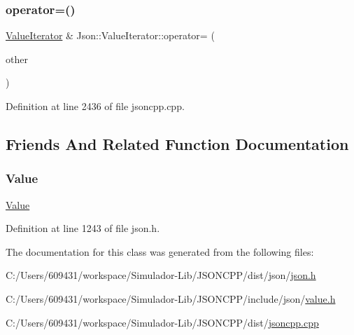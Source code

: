 \hypertarget{class_json_1_1_value_iterator_a8e23312b1db874f7e403fd7e76611bdc}{}\label{class_json_1_1_value_iterator_a8e23312b1db874f7e403fd7e76611bdc} 
\subsubsection{\texorpdfstring{operator=()}{operator=()}\hspace{0.1cm}{\footnotesize\ttfamily [2/2]}}
{\footnotesize\ttfamily \hyperlink{class_json_1_1_value_iterator}{Value\+Iterator} \& Json\+::\+Value\+Iterator\+::operator= (\begin{DoxyParamCaption}\item[{const \hyperlink{class_json_1_1_value_iterator_base_a9d2a940d03ea06d20d972f41a89149ee}{Self\+Type} \&}]{other }\end{DoxyParamCaption})}



Definition at line 2436 of file jsoncpp.\+cpp.



\subsection{Friends And Related Function Documentation}
\hypertarget{class_json_1_1_value_iterator_a896c037a32087c5c20d97e64a1786880}{}\label{class_json_1_1_value_iterator_a896c037a32087c5c20d97e64a1786880} 
\subsubsection{\texorpdfstring{Value}{Value}}
{\footnotesize\ttfamily \hyperlink{class_json_1_1_value}{Value}\hspace{0.3cm}{\ttfamily [friend]}}



Definition at line 1243 of file json.\+h.



The documentation for this class was generated from the following files\+:\begin{DoxyCompactItemize}
\item 
C\+:/\+Users/609431/workspace/\+Simulador-\/\+Lib/\+J\+S\+O\+N\+C\+P\+P/dist/json/\hyperlink{dist_2json_2json_8h}{json.\+h}\item 
C\+:/\+Users/609431/workspace/\+Simulador-\/\+Lib/\+J\+S\+O\+N\+C\+P\+P/include/json/\hyperlink{value_8h}{value.\+h}\item 
C\+:/\+Users/609431/workspace/\+Simulador-\/\+Lib/\+J\+S\+O\+N\+C\+P\+P/dist/\hyperlink{jsoncpp_8cpp}{jsoncpp.\+cpp}\end{DoxyCompactItemize}
